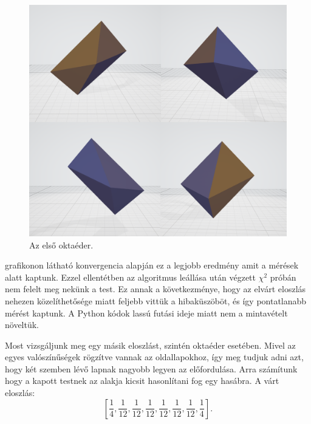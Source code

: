 \begin{figure}[h!]
	\centering
	\includegraphics[width=\textwidth]{images/octa01obj.png}
	\caption{Az első oktaéder.}
	\label{fig:octa01obj}
\end{figure}

 grafikonon látható konvergencia alapján ez a legjobb eredmény amit a mérések alatt kaptunk.
Ezzel ellentétben az algoritmus leállása után végzett $\chi^2$ próbán nem felelt meg nekünk a test.
Ez annak a következménye, hogy az elvárt eloszlás nehezen közelíthetősége miatt feljebb vittük a hibaküszöböt, és így pontatlanabb mérést kaptunk.
A Python kódok lassú futási ideje miatt nem a mintavételt növeltük.

Most vizsgáljunk meg egy másik eloszlást, szintén oktaéder esetében. Mivel az egyes valószínűségek rögzítve vannak az oldallapokhoz, így meg tudjuk adni azt, hogy két szemben lévő lapnak nagyobb legyen az előfordulása.
Arra számítunk hogy a kapott testnek az alakja kicsit hasonlítani fog egy hasábra.
A várt eloszlás:
\[
\left[\frac{1}{4}, \frac{1}{12}, \frac{1}{12}, \frac{1}{12}, \frac{1}{12}, \frac{1}{12}, \frac{1}{12}, \frac{1}{4}\right].
\]

